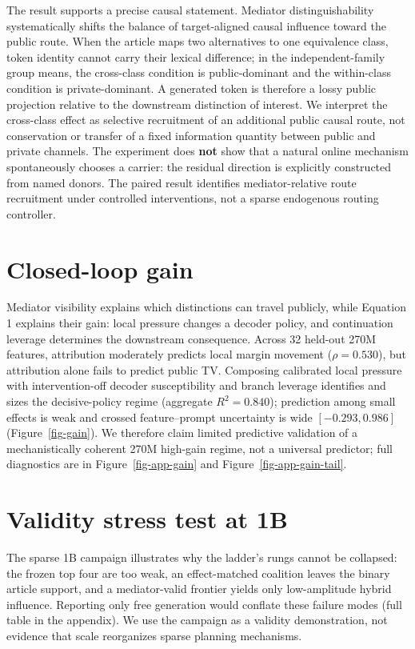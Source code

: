 \documentclass[
]{article}
\begin{document}
The result supports a precise causal statement. Mediator
distinguishability systematically shifts the balance of target-aligned
causal influence toward the public route. When the article maps two
alternatives to one equivalence class, token identity cannot carry their
lexical difference; in the independent-family group means, the
cross-class condition is public-dominant and the within-class condition
is private-dominant. A generated token is therefore a lossy public
projection relative to the downstream distinction of interest. We
interpret the cross-class effect as selective recruitment of an
additional public causal route, not conservation or transfer of a fixed
information quantity between public and private channels. The experiment
does \textbf{not} show that a natural online mechanism spontaneously
chooses a carrier: the residual direction is explicitly constructed from
named donors. The paired result identifies mediator-relative route
recruitment under controlled interventions, not a sparse endogenous
routing controller.

\section{Closed-loop gain}\label{closed-loop-gain}

Mediator visibility explains which distinctions can travel publicly,
while Equation 1 explains their gain: local pressure changes a decoder
policy, and continuation leverage determines the downstream consequence.
Across 32 held-out 270M features, attribution moderately predicts local
margin movement (\(\rho=0.530\)), but attribution alone fails to predict
public TV. Composing calibrated local pressure with intervention-off
decoder susceptibility and branch leverage identifies and sizes the
decisive-policy regime (aggregate \(R^2=0.840\)); prediction among small
effects is weak and crossed feature--prompt uncertainty is wide
\([-0.293,0.986]\) (Figure~\ref{fig-gain}). We therefore claim limited
predictive validation of a mechanistically coherent 270M high-gain
regime, not a universal predictor; full diagnostics are in
Figure~\ref{fig-app-gain} and Figure~\ref{fig-app-gain-tail}.

\section{Validity stress test at 1B}\label{validity-stress-test-at-1b}

The sparse 1B campaign illustrates why the ladder's rungs cannot be
collapsed: the frozen top four are too weak, an effect-matched coalition
leaves the binary article support, and a mediator-valid frontier yields
only low-amplitude hybrid influence. Reporting only free generation
would conflate these failure modes (full table in the appendix). We use
the campaign as a validity demonstration, not evidence that scale
reorganizes sparse planning mechanisms.
\end{document}

